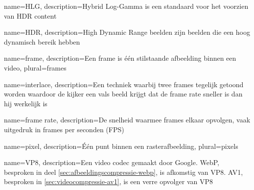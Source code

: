 {
	name={HLG},
	description={Hybrid Log-Gamma is een standaard voor het voorzien van HDR content}
}

{
	name={HDR},
	description={High Dynamic Range beelden zijn beelden die een hoog dynamisch bereik hebben}
}

{
	name={frame},
	description={Een frame is één stilstaande afbeelding binnen een video},
	plural={frames}
}

{
	name={interlace},
	description={Een techniek waarbij twee frames tegelijk getoond worden waardoor de kijker een vals beeld krijgt dat de frame rate sneller is dan hij werkelijk is}
}

{
	name={frame rate},
	description={De snelheid waarmee frames elkaar opvolgen, vaak uitgedruk in frames per seconden (FPS)}
}

{
	name={pixel},
	description={Één punt binnen een rasterafbeelding},
	plural={pixels}
}

{
	name={VP8},
	description={Een video codec gemaakt door Google. WebP, besproken in deel \ref{sec:afbeeldingscompressie-webp}, is afkomstig van VP8. AV1, besproken in \ref{sec:videocompressie-av1}, is een verre opvolger van VP8}
}